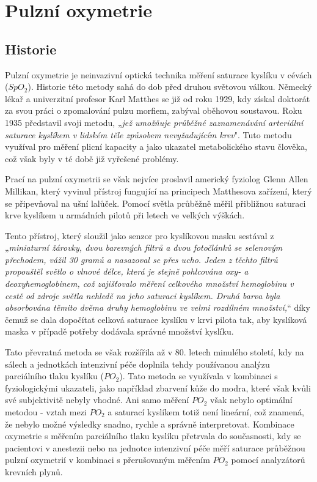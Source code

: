 \section {Pulzní oxymetrie}
\subsection {Historie}
Pulzní oxymetrie je neinvazivní optická technika měření saturace kyslíku v cévách ($SpO_2$). Historie této metody sahá do dob před druhou světovou válkou. Německý lékař a univerzitní profesor Karl Matthes se již od roku 1929, kdy získal doktorát za svou práci o zpomalování pulzu morfiem, zabýval oběhovou soustavou. Roku 1935 představil svoji metodu, „\emph{jež umožňuje průběžné zaznamenávání arteriální saturace kyslíkem v lidském těle způsobem nevyžadujícím krev}". Tuto metodu využíval pro měření plicní kapacity a jako ukazatel metabolického stavu člověka, což však byly v té době již vyřešené problémy. \citep{matthes}
\par Prací na pulzní oxymetrii se však nejvíce proslavil americký fyziolog Glenn Allen Millikan, který vyvinul přístroj fungující na principech Matthesova zařízení, který se připevňoval na ušní lalůček. Pomocí světla průběžně měřil přibližnou saturaci krve kyslíkem u armádních pilotů při letech ve velkých výškách. \citep{TremperPulseOximetry}
\par Tento přístroj, který sloužil jako senzor pro kyslíkovou masku sestával z „\emph{miniaturní žárovky, dvou barevných filtrů a dvou fotočlánků se selenovým přechodem, vážil 30 gramů a nasazoval se přes ucho. Jeden z těchto filtrů propouštěl světlo o vlnové délce, která je stejně pohlcována oxy- a deoxyhemoglobinem, což zajišťovalo měření celkového množství hemoglobinu v cestě od zdroje světla nehledě na jeho saturaci kyslíkem. Druhá barva byla absorbována těmito dvěma druhy hemoglobinu ve velmi rozdílném množství,}“ díky čemuž se dala dopočítat celková saturace kyslíku v krvi pilota tak, aby kyslíková maska v případě potřeby dodávala správné množství kyslíku. \citep{1942oximeter}
\par Tato převratná metoda se však rozšířila až v 80. letech minulého století, kdy na sálech a jednotkách intenzivní péče doplnila tehdy používanou analýzu parciálního tlaku kyslíku ($PO_2$). Tato metoda se využívala v kombinaci s fyziologickými ukazateli, jako například zbarvení kůže do modra, které však kvůli své subjektivitě nebyly vhodné. Ani samo měření $PO_2$ však nebylo optimální metodou - vztah mezi $PO_2$ a saturací kyslíkem totiž není lineární, což znamená, že nebylo možné výsledky snadno, rychle a správně interpretovat. Kombinace oxymetrie s měřením parciálního tlaku kyslíku přetrvala do současnosti, kdy se pacientovi v anestezii nebo na jednotce intenzivní péče měří saturace průběžnou pulzní oxymetrií v kombinaci s přerušovaným měřením $PO_2$ pomocí analyzátorů krevních plynů. \citep{KYRIACOU}
